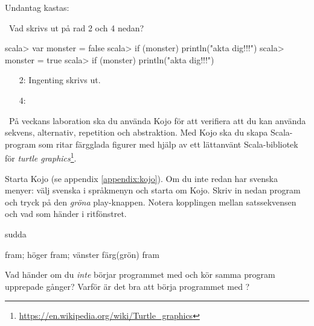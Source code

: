 \SubtaskSolved {}

\SubtaskSolved Undantag kastas: 

\SubtaskSolved {}

\QUESTEND






\QUESTBEGIN

\Task \what~Vad skrivs ut på rad 2 och 4 nedan?

\begin{REPL}
scala> var monster = false
scala> if (monster) println("akta dig!!!")
scala> monster = true
scala> if (monster) println("akta dig!!!")
\end{REPL}

\SOLUTION

\TaskSolved \what

\begin{itemize}
\item[2:] Ingenting skrivs ut.
\item[4:] 
\end{itemize}


\QUESTEND







\QUESTBEGIN

\Task \what~På veckans laboration ska du använda Kojo för att verifiera att du kan använda sekvens, alternativ, repetition och abstraktion. Med Kojo ska du skapa Scala-program som ritar färgglada figurer med hjälp av ett lättanvänt Scala-bibliotek för \emph{turtle graphics}\footnote{\url{https://en.wikipedia.org/wiki/Turtle_graphics}}.

Starta Kojo (se appendix \ref{appendix:kojo}). Om du inte redan har svenska menyer: välj svenska i språkmenyn och starta om Kojo.  Skriv in nedan program och tryck på den \emph{gröna} play-knappen. Notera kopplingen mellan satssekvensen och vad som händer i ritfönstret.

\begin{Code}
sudda

fram; höger
fram; vänster
färg(grön)
fram
\end{Code}
\noindent


\Subtask Vad händer om du \emph{inte} börjar programmet med  och kör samma program upprepade gånger? Varför är det bra att börja programmet med ?


